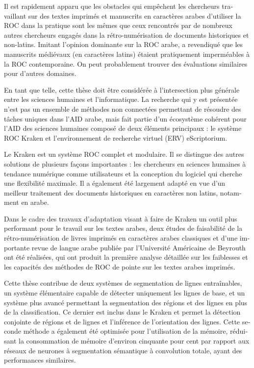 \begin{french}
Il est rapidement apparu que les obstacles qui empêchent les chercheurs
travaillant sur des textes imprimés et manuscrits en caractères arabes
d'utiliser la ROC dans la pratique sont les mêmes que ceux rencontrés par de
nombreux autres chercheurs engagés dans la rétro-numérisation de documents
historiques et non-latins. Imitant l'opinion dominante sur la ROC arabe,
\cite{widner2017toward} a revendiqué que les manuscrits médiévaux (en
caractères latins) étaient pratiquement imperméables à la ROC contemporaine. On
peut probablement trouver des évaluations similaires pour d'autres domaines.

En tant que telle, cette thèse doit être considérée à l'intersection plus
générale entre les sciences humaines et l'informatique. La recherche qui y est
présentée n'est pas un ensemble de méthodes non connectées permettant de
résoudre des tâches uniques dans l'AID arabe, mais fait partie d'un écosystème
cohérent pour l'AID des sciences humaines composé de deux éléments principaux :
le système ROC Kraken et l'environnement de recherche virtuel (ERV)
eScriptorium.

Le Kraken est un système ROC complet et modulaire. Il se distingue des autres
solutions de plusieurs façons importantes : les chercheurs en sciences humaines
à tendance numérique comme utilisateurs et la conception du logiciel qui
cherche une flexibilité maximale. Il a également été largement adapté en vue
d'un meilleur traitement des documents historiques en caractères non latins,
notamment en arabe.

Dans le cadre des travaux d'adaptation visant à faire de Kraken un outil plus
performant pour le travail sur les textes arabes, deux études de faisabilité de
la rétro-numérisation de livres imprimés en caractères arabes classiques et
d'une importante revue de langue arabe publiée par l'Université Américaine de
Beyrouth ont été réalisées, qui ont produit la première analyse détaillée sur
les faiblesses et les capacités des méthodes de ROC de pointe sur les textes
arabes imprimés.

Cette thèse contribue de deux systèmes de segmentation de lignes entraînables,
un système élémentaire capable de détecter uniquement les lignes de base, et un
système plus avancé permettant la segmentation des régions et des lignes en
plus de la classification. Ce dernier est inclus dans le Kraken et permet la
détection conjointe de régions et de lignes et l'inférence de l'orientation des
lignes. Cette seconde méthode a également été optimisée pour l'utilisation de
la mémoire, réduisant la consommation de mémoire d'environ cinquante pour cent
par rapport aux réseaux de neurones à segmentation sémantique à convolution
totale, ayant des performances similaires.


\end{french}
